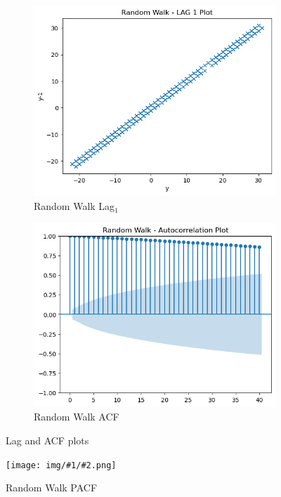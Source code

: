 \documentclass{article}
\newcommand{\fig}[3] {
\begin{figure}[H]
\centering
\texttt{[image: img/\#1/\#2.png]}
\caption{#3}
\label{figure:#1_#2}
\end{figure}
}
\begin{document}
\begin{figure}[htbp]
  \centering
  \begin{subfigure}[b]{0.45\textwidth}
    \includegraphics[width=\textwidth]{img/random_walk/lag_1.png}
    \caption{Random Walk Lag$_1$}
    \label{fig:rndmwalklag}
  \end{subfigure}
  \hfill
  \begin{subfigure}[b]{0.45\textwidth}
    \includegraphics[width=\textwidth]{img/random_walk/acf.png}
    \caption{Random Walk ACF}
    \label{fig:rndmwalkacf}
  \end{subfigure}
  \caption{Lag and ACF plots}
  \label{fig:rndmwalk3}
\end{figure}
\fig{random_walk}{pacf}{Random Walk PACF}
\end{document}
